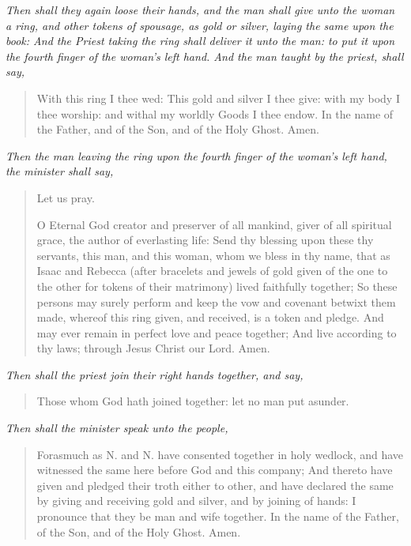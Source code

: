 \documentclass[
]{book}
\begin{document}
\emph{Then shall they again loose their hands, and the man shall give unto the woman a ring, and other tokens of spousage, as gold or silver, laying the same upon the book: And the Priest taking the ring shall deliver it unto the man: to put it upon the fourth finger of the woman's left hand. And the man taught by the priest, shall say,}

\begin{quote}
With this ring I thee wed: This gold and silver I thee give: with my body I thee worship: and withal my worldly Goods I thee endow. In the name of the Father, and of the Son, and of the Holy Ghost. Amen.
\end{quote}

\emph{Then the man leaving the ring upon the fourth finger of the woman's left hand, the minister shall say,}

\begin{quote}
Let us pray.

O Eternal God creator and preserver of all mankind, giver of all spiritual grace, the author of everlasting life: Send thy blessing upon these thy servants, this man, and this woman, whom we bless in thy name, that as Isaac and Rebecca (after bracelets and jewels of gold given of the one to the other for tokens of their matrimony) lived faithfully together; So these persons may surely perform and keep the vow and covenant betwixt them made, whereof this ring given, and received, is a token and pledge. And may ever remain in perfect love and peace together; And live according to thy laws; through Jesus Christ our Lord. Amen.
\end{quote}

\emph{Then shall the priest join their right hands together, and say,}

\begin{quote}
Those whom God hath joined together: let no man put asunder.
\end{quote}

\emph{Then shall the minister speak unto the people,}

\begin{quote}
Forasmuch as N. and N. have consented together in holy wedlock, and have witnessed the same here before God and this company; And thereto have given and pledged their troth either to other, and have declared the same by giving and receiving gold and silver, and by joining of hands: I pronounce that they be man and wife together. In the name of the Father, of the Son, and of the Holy Ghost. Amen.
\end{quote}
\end{document}
